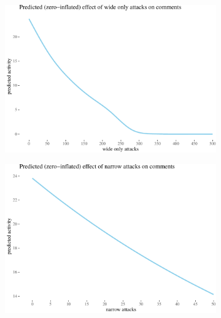 \documentclass[10pt,]{scrartcl}
\begin{document}
\begin{figure}
\begin{subfigure}[b]{0.45\textwidth}

\begin{center}\includegraphics[width=1\linewidth]{redditAnalysisWalkthrough_files/figure-latex/unnamed-chunk-104-1} \end{center}
\end{subfigure}
\hfill
\begin{subfigure}[b]{0.45\textwidth}

\begin{center}\includegraphics[width=1\linewidth]{redditAnalysisWalkthrough_files/figure-latex/unnamed-chunk-105-1} \end{center}
\end{subfigure}


\end{figure}
\end{document}

